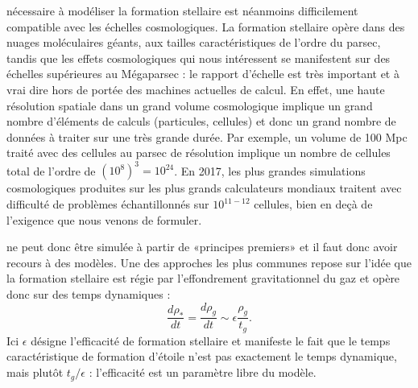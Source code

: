  nécessaire à modéliser la formation stellaire est néanmoins difficilement compatible avec les échelles cosmologiques. La formation stellaire opère dans des nuages moléculaires géants, aux tailles caractéristiques de l'ordre du parsec, tandis que les effets cosmologiques qui nous intéressent se manifestent sur des échelles supérieures au Mégaparsec : le rapport d'échelle est très important et à vrai dire hors de portée des machines actuelles de calcul. En effet, une haute résolution spatiale dans un grand volume cosmologique implique un grand nombre d'éléments de calculs (particules, cellules) et donc un grand nombre de données à traiter sur une très grande durée. Par exemple, un volume de 100 Mpc traité avec des cellules au parsec de résolution implique un nombre de cellules total de l'ordre de $(10^8)^3=10^{24}$. En 2017, les plus grandes simulations cosmologiques produites sur les plus grands calculateurs mondiaux traitent avec difficulté de problèmes échantillonnés sur $10^{11-12}$ cellules, bien en deçà de l'exigence que nous venons de formuler.

 ne peut donc être simulée à partir de «principes premiers» et il faut donc avoir recours à des modèles. Une des approches les plus communes repose sur l'idée que la formation stellaire est régie par l'effondrement gravitationnel du gaz et opère donc sur des temps dynamiques :
\begin{equation}
\frac{d \rho_*}{dt}=\frac{d \rho_g}{dt}\sim\epsilon\frac{\rho_g}{t_g}.
\end{equation}
Ici $\epsilon$ désigne l'efficacité de formation stellaire et manifeste le fait que le temps caractéristique de formation d'étoile n'est pas exactement le temps dynamique, mais plutôt $t_g/\epsilon$ : l'efficacité est un paramètre libre du modèle.

